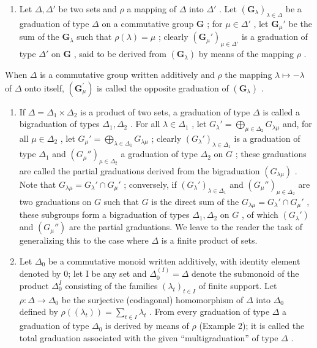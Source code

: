 \begin{enumerate}
\def\labelenumi{(\arabic{enumi})}
\setcounter{enumi}{1}
\tightlist
\item
  Let \(\Delta, \Delta'\) be two sets and \(\rho\) a mapping of \(\Delta\) into \(\Delta'\) . Let \((\mathbf{G}_{\lambda})_{\lambda \in \Delta}\) be a graduation of type \(\Delta\) on a commutative group \(\mathbf{G}\) ; for \(\mu \in \Delta'\) , let \(\mathbf{G}_{\mu}'\) be the sum of the \(\mathbf{G}_{\lambda}\) such that \(\rho(\lambda) = \mu\) ; clearly \((\mathbf{G}_{\mu}')_{\mu \in \Delta'}\) is a graduation of type \(\Delta'\) on \(\mathbf{G}\) , said to be derived from \((\mathbf{G}_{\lambda})\) by means of the mapping \(\rho\) .
\end{enumerate}

When \(\Delta\) is a commutative group written additively and \(\rho\) the mapping \(\lambda \mapsto -\lambda\) of \(\Delta\) onto itself, \((\mathbf{G}_{\mu}^{\prime})\) is called the opposite graduation of \((\mathbf{G}_{\lambda})\) .

\begin{enumerate}
\def\labelenumi{(\arabic{enumi})}
\setcounter{enumi}{2}
\item
  If \(\Delta = \Delta_1 \times \Delta_2\) is a product of two sets, a graduation of type \(\Delta\) is called a bigraduation of types \(\Delta_1, \Delta_2\) . For all \(\lambda \in \Delta_1\) , let \(G_{\lambda}' = \bigoplus_{\mu \in \Delta_2} G_{\lambda\mu}\) and, for all \(\mu \in \Delta_2\) , let \(G_{\mu}' = \bigoplus_{\lambda \in \Delta_1} G_{\lambda\mu}\) ; clearly \((G_{\lambda}')_{\lambda \in \Delta_1}\) is a graduation of type \(\Delta_1\) and \((G_{\mu}'')_{\mu \in \Delta_2}\) a graduation of type \(\Delta_2\) on \(G\) ; these graduations are called the partial graduations derived from the bigraduation \((G_{\lambda\mu})\) . Note that \(G_{\lambda\mu} = G_{\lambda}' \cap G_{\mu}'\) ; conversely, if \((G_{\lambda}')_{\lambda \in \Delta_1}\) and \((G_{\mu}'')_{\mu \in \Delta_2}\) are two graduations on \(G\) such that \(G\) is the direct sum of the \(G_{\lambda\mu} = G_{\lambda}' \cap G_{\mu}'\) , these subgroups form a bigraduation of types \(\Delta_1, \Delta_2\) on \(G\) , of which \((G_{\lambda}')\) and \((G_{\mu}'')\) are the partial graduations. We leave to the reader the task of generalizing this to the case where \(\Delta\) is a finite product of sets.
\item
  Let \(\Delta_0\) be a commutative monoid written additively, with identity element denoted by 0; let I be any set and \(\Delta_0^{(I)} = \Delta\) denote the submonoid of the product \(\Delta_0^I\) consisting of the families \((\lambda_t)_{t \in I}\) of finite support. Let \(\rho: \Delta \to \Delta_0\) be the surjective (codiagonal) homomorphism of \(\Delta\) into \(\Delta_0\) defined by \(\rho((\lambda_t)) = \sum_{t \in I} \lambda_t\) . From every graduation of type \(\Delta\) a graduation of type \(\Delta_0\) is derived by means of \(\rho\) (Example 2); it is called the total graduation associated with the given ``multigraduation'' of type \(\Delta\) .
\end{enumerate}

